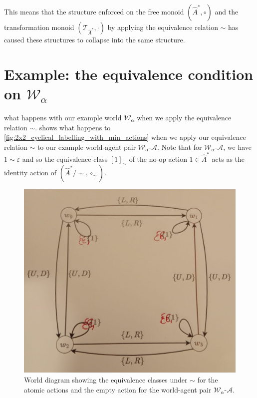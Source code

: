 This means that the structure enforced on the free monoid $(\hat{A}^{*}, \circ)$ and the transformation monoid $(\mathcal{T}_{\hat{A}^{\ast}}, \cdot)$ by applying the equivalence relation $\sim$ has caused these structures to collapse into the same structure.

\section{
Example: the equivalence condition on \texorpdfstring{$\mathscr{W}_{\alpha}$}{the toy world}
 }\label{sec:the_equivalence_condition_on_example_world}

 what happens with our example world $\mathscr{W}_{\alpha}$ when we apply the equivalence relation $\sim$.  shows what happens to \cref{fig:2x2_cyclical_labelling_with_min_actions} when we apply our equivalence relation $\sim$ to our example world-agent pair $\mathscr{W}_{\alpha}$-$\mathscr{A}$.
Note that for $\mathscr{W}_{\alpha}$-$\mathscr{A}$, we have $1 \sim \varepsilon$ and so the equivalence class $[1]_{\sim}$ of the no-op action $1 \in \hat{A}^{*}$ acts as the identity action of $(\hat{A}^{*}/\sim, \circ_{\sim})$.

\begin{figure}[H]
    \centering
    \includegraphics[width=0.5\linewidth]{2MathematicalFramework/Images/2x2_cyclical_equivalence_min_actions.jpeg}
    \caption{
    World diagram showing the equivalence classes under $\sim$ for the atomic actions and the empty action for the world-agent pair $\mathscr{W}_{\alpha}$-$\mathscr{A}$.
    }
    \label{fig:2x2_cyclical_equivalence_min_actions}
\end{figure}

